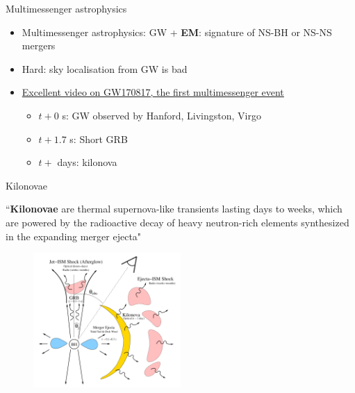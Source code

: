 \documentclass[usenames,dvipsnames,t]{beamer}
\begin{document}
\begin{frame}{Multimessenger astrophysics}

  \def\x{5mm}

  \def\y{3mm}

\begin{itemize}
  \item Multimessenger astrophysics: GW + \textbf{EM}: signature of NS-BH or NS-NS mergers
  
  \vspace{\x}
  
  \item Hard: sky localisation from GW is bad 
  
  \vspace{\x}

  \item \href{https://youtu.be/xBvz5ilc8rE?si=75NmXKUTWbuUlOjW}{Excellent video on GW170817, the first multimessenger event}
  \begin{itemize}
    \item $t + 0$ s: GW observed by Hanford, Livingston, Virgo
    
    \vspace{\y}
    
    \item $t + 1.7$ s: Short GRB
    
    \vspace{\y}
    
    \item $t + $ days: kilonova
  \end{itemize}
  
  \vspace{\x}


\end{itemize}

\end{frame}

\begin{frame}{Kilonovae}

  ``\textbf{Kilonovae} are thermal supernova-like transients lasting days to weeks, which are powered by the radioactive decay of heavy neutron-rich elements synthesized in the expanding merger ejecta"~\cite{Metzger:2019zeh}

  \begin{figure}
    \centering
    \includegraphics[width=0.5\textwidth]{Figures/EM-counterparts.png}
  \end{figure}
\end{frame}
\end{document}
